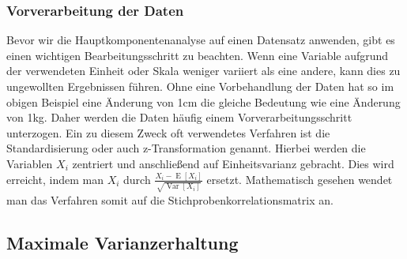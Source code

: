 \subsubsection{Vorverarbeitung der Daten}

Bevor wir die Hauptkomponentenanalyse auf einen Datensatz anwenden, gibt es einen wichtigen Bearbeitungsschritt zu beachten. Wenn eine Variable aufgrund der verwendeten Einheit oder Skala weniger variiert als eine andere, kann dies zu ungewollten Ergebnissen führen. Ohne eine Vorbehandlung der Daten hat so im obigen Beispiel eine Änderung von 1cm die gleiche Bedeutung wie eine Änderung von 1kg.  Daher werden die Daten häufig einem Vorverarbeitungsschritt unterzogen. Ein zu diesem Zweck oft verwendetes Verfahren ist die Standardisierung oder auch z-Transformation genannt. Hierbei werden die Variablen $X_i$ zentriert und anschließend auf Einheitsvarianz gebracht. Dies wird erreicht, indem man $X_i$ durch $\frac{X_i - \operatorname{E}[X_i]}{\sqrt{\operatorname{Var}[X_i]}}$ ersetzt. Mathematisch gesehen wendet man das Verfahren somit auf die Stichprobenkorrelationsmatrix an.

\subsection{Maximale Varianzerhaltung}

